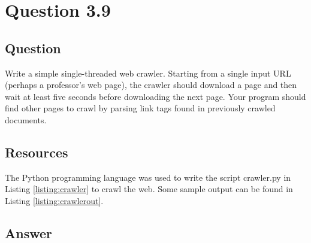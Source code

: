 \section{Question 3.9}

\subsection{Question}
Write a simple single-threaded web crawler. Starting from a single input URL (perhaps a professor's web page), the crawler should download a page and then wait at least five seconds before downloading the next page. Your program should find other pages to crawl by parsing link tags found in previously crawled documents.


\subsection{Resources}
The Python programming language \cite{python} was used to write the script {\ttfamily crawler.py} in Listing \ref{listing:crawler} to crawl the web.  Some sample output can be found in Listing \ref{listing:crawlerout}.


\subsection{Answer}



